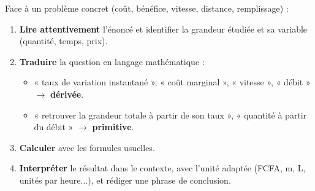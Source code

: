 \documentclass[11pt]{article}
\newcommand{\cle}[1]{{\popxbold\color{popdark}#1}}
\begin{document}
\begin{methode}
Face à un problème concret (coût, bénéfice, vitesse, distance, remplissage) :
\begin{enumerate}
\item \textbf{Lire attentivement} l'énoncé et identifier la grandeur étudiée et sa variable (quantité, temps, prix).
\item \textbf{Traduire} la question en langage mathématique :
      \begin{itemize}
      \item « taux de variation instantané », « coût marginal », « vitesse », « débit » $\to$ \textbf{dérivée}.
      \item « retrouver la grandeur totale à partir de son taux », « quantité à partir du débit » $\to$ \textbf{primitive}.
      \end{itemize}
\item \textbf{Calculer} avec les formules usuelles.
\item \textbf{Interpréter} le résultat dans le contexte, avec l'\cle{unité} adaptée (FCFA, m, L, unités par heure...), et rédiger une phrase de conclusion.
\end{enumerate}
\end{methode}
\end{document}
